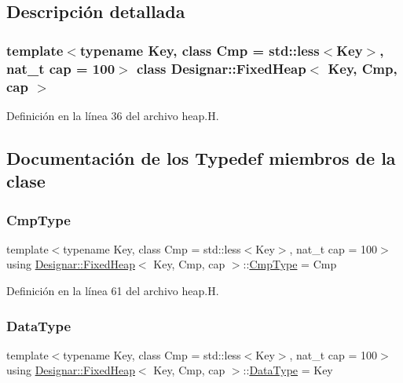 \subsection{Descripción detallada}
\subsubsection*{template$<$typename Key, class Cmp = std\+::less$<$\+Key$>$, nat\+\_\+t cap = 100$>$\newline
class Designar\+::\+Fixed\+Heap$<$ Key, Cmp, cap $>$}



Definición en la línea 36 del archivo heap.\+H.



\subsection{Documentación de los \textquotesingle{}Typedef\textquotesingle{} miembros de la clase}
\mbox{\label{class_designar_1_1_fixed_heap_a0dab9096a5119723285ee3d4f1a4cee9}} 
\subsubsection{\texorpdfstring{Cmp\+Type}{CmpType}}
{\footnotesize\ttfamily template$<$typename Key, class Cmp = std\+::less$<$\+Key$>$, nat\+\_\+t cap = 100$>$ \\
using \hyperlink{class_designar_1_1_fixed_heap}{Designar\+::\+Fixed\+Heap}$<$ Key, Cmp, cap $>$\+::\hyperlink{class_designar_1_1_fixed_heap_a0dab9096a5119723285ee3d4f1a4cee9}{Cmp\+Type} =  Cmp}



Definición en la línea 61 del archivo heap.\+H.

\mbox{\label{class_designar_1_1_fixed_heap_a48202f857a59e2753aa72625f0d90f94}} 
\subsubsection{\texorpdfstring{Data\+Type}{DataType}}
{\footnotesize\ttfamily template$<$typename Key, class Cmp = std\+::less$<$\+Key$>$, nat\+\_\+t cap = 100$>$ \\
using \hyperlink{class_designar_1_1_fixed_heap}{Designar\+::\+Fixed\+Heap}$<$ Key, Cmp, cap $>$\+::\hyperlink{class_designar_1_1_fixed_heap_a48202f857a59e2753aa72625f0d90f94}{Data\+Type} =  Key}



